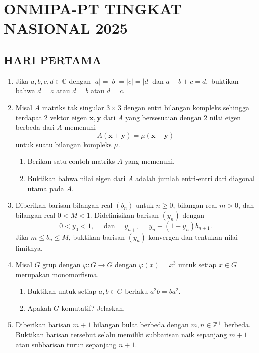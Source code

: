 \documentclass[12pt,twoside]{article}
\begin{document}
\pagebreak

\section{ONMIPA-PT TINGKAT NASIONAL 2025}
\subsection{HARI PERTAMA}
\begin{enumerate}
    \item Jika $a,b,c,d \in \mathbb{C}$ dengan $|a| = |b| = |c| = |d|$ dan
          $
              a + b + c = d,
          $
          buktikan bahwa $d = a$ atau $d = b$ atau $d = c$.

    \item Misal $A$ matriks tak singular $3 \times 3$ dengan entri bilangan kompleks sehingga terdapat 2 vektor eigen $\mathbf{x},\mathbf{y}$ dari $A$ yang bersesuaian dengan 2 nilai eigen berbeda dari $A$ memenuhi
          \[
              A(\mathbf{x}+\mathbf{y}) = \mu (\mathbf{x}-\mathbf{y})
          \]
          untuk suatu bilangan kompleks $\mu$.
          \begin{enumerate}
              \item Berikan satu contoh matriks $A$ yang memenuhi.
              \item Buktikan bahwa nilai eigen dari $A$ adalah jumlah entri-entri dari diagonal utama pada $A$.
          \end{enumerate}

    \item Diberikan barisan bilangan real $(b_n)$ untuk $n\ge 0$, bilangan real $m>0$, dan bilangan real $0<M<1$. Didefinisikan barisan $(y_n)$ dengan
          \[
              0 < y_0 < 1,
              \quad \text{ dan }\quad
              y_{n+1} = y_n + (1 + y_n)b_{n+1}.
          \]
          Jika $m \le b_n \le M$, buktikan barisan $(y_n)$ konvergen dan tentukan nilai limitnya.

    \item Misal $G$ grup dengan $\varphi : G \to G$ dengan $\varphi(x) = x^3$ untuk setiap $x \in G$ merupakan monomorfisma.

          \begin{enumerate}
              \item Buktikan untuk setiap $a,b \in G$ berlaku
                    $
                        a^2 b = b a^2.
                    $
              \item Apakah $G$ komutatif? Jelaskan.
          \end{enumerate}

    \item Diberikan barisan $m+1$ bilangan bulat berbeda dengan $m,n \in \mathbb{Z}^+$ berbeda.
          Buktikan barisan tersebut selalu memiliki subbarisan naik sepanjang $m+1$ atau subbarisan turun sepanjang $n+1$.
\end{enumerate}
\pagebreak
\end{document}
